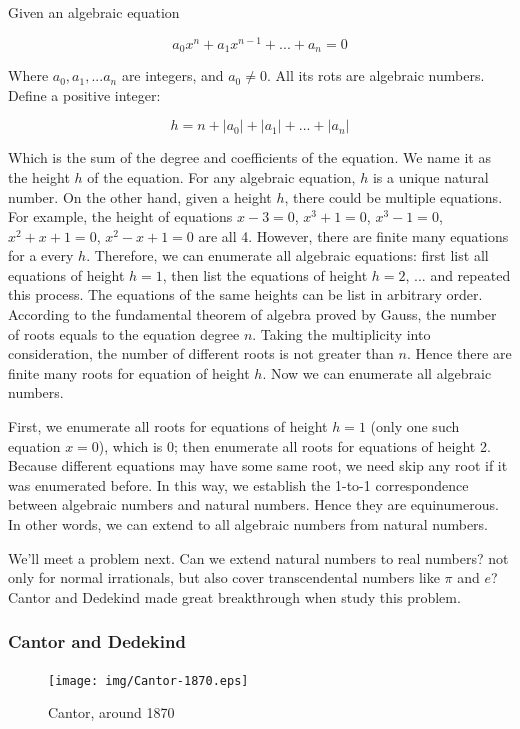 \documentclass{article}
\begin{document}
\begin{enumerate}
Given an algebraic equation

\[
a_0 x^n + a_1 x^{n-1} + ... + a_n = 0
\]

Where $a_0, a_1, ... a_n$ are integers, and $a_0 \neq 0$. All its rots are algebraic numbers. Define a positive integer:

\[
h = n + |a_0| + |a_1| + ... + |a_n|
\]

Which is the sum of the degree and coefficients of the equation. We name it as the height $h$ of the equation. For any algebraic equation, $h$ is a unique natural number. On the other hand, given a height $h$, there could be multiple equations. For example, the height of equations $x - 3 = 0$, $x^3 + 1 = 0$, $x^3 - 1 = 0$, $x^2 + x + 1 = 0$, $x^2 - x + 1 = 0$ are all 4. However, there are finite many equations for a every $h$. Therefore, we can enumerate all algebraic equations: first list all equations of height $h=1$, then list the equations of height $h=2$, ... and repeated this process. The equations of the same heights can be list in arbitrary order. According to the fundamental theorem of algebra proved by Gauss, the number of roots equals to the equation degree $n$. Taking the multiplicity into consideration, the number of different roots is not greater than $n$. Hence there are finite many roots for equation of height $h$. Now we can enumerate all algebraic numbers.

First, we enumerate all roots for equations of height $h=1$ (only one such equation $x = 0$), which is 0; then enumerate all roots for equations of height 2. Because different equations may have some same root, we need skip any root if it was enumerated before. In this way, we establish the 1-to-1 correspondence between algebraic numbers and natural numbers. Hence they are equinumerous. In other words, we can extend to all algebraic numbers from natural numbers.
\end{enumerate}

We'll meet a problem next. Can we extend natural numbers to real numbers? not only for normal irrationals, but also cover transcendental numbers like $\pi$ and $e$? Cantor and Dedekind made great breakthrough when study this problem.

\subsubsection{Cantor and Dedekind}

\begin{figure}
 \centering
 \texttt{[image: img/Cantor-1870.eps]}
 \captionsetup{labelformat=empty}
 \caption{Cantor, around 1870}
 \label{fig:Cantor-1870}
\end{figure}
\end{document}
